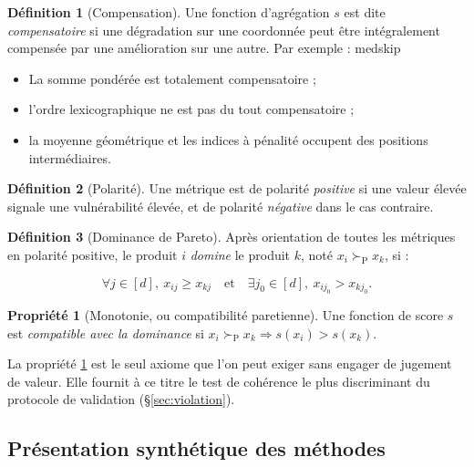 \documentclass[11pt,a4paper]{article}
\theoremstyle{definition}
\newtheorem{definition}{Définition}[section]
\newtheorem{propriete}{Propriété}[section]
\theoremstyle{remark}
\newcommand{\pareto}{\succ_{\mathrm{P}}}
\begin{document}
\begin{definition}[Compensation]
  Une fonction d'agrégation $s$ est dite \emph{compensatoire} si une dégradation sur une coordonnée
  peut être intégralement compensée par une amélioration sur une autre. Par exemple :
  medskip
  \begin{itemize}
    \item La somme pondérée est totalement compensatoire ; 
    \item l'ordre lexicographique ne est pas du tout compensatoire ;
    \item la moyenne géométrique et les indices à pénalité occupent des positions intermédiaires.
  \end{itemize}
\end{definition}

\bigskip

\begin{definition}[Polarité]
  Une métrique est de polarité \emph{positive} si une valeur élevée signale une vulnérabilité
  élevée, et de polarité \emph{négative} dans le cas contraire.
\end{definition}

\bigskip

\begin{definition}[Dominance de Pareto]
  \label{def:pareto}
  Après orientation de toutes les métriques en polarité positive, le produit $i$ \emph{domine} le
  produit $k$, noté $x_i \pareto x_k$, si :

  \medskip

  \[
  \forall j \in [d],\ x_{ij} \ge x_{kj}
  \quad\text{et}\quad
  \exists j_0 \in [d],\ x_{ij_0} > x_{kj_0}.
  \]
\end{definition}

\bigskip

\begin{propriete}[Monotonie, ou compatibilité paretienne]
  \label{prop:monotonie}
  Une fonction de score $s$ est \emph{compatible avec la dominance} si
  $x_i \pareto x_k \Rightarrow s(x_i) > s(x_k)$.
\end{propriete}

La propriété \ref{prop:monotonie} est le seul axiome que l'on peut exiger sans engager de
jugement de valeur. Elle fournit à ce titre le test de cohérence le plus discriminant du
protocole de validation (§\ref{sec:violation}).

\subsection{Présentation synthétique des méthodes}
\end{document}
